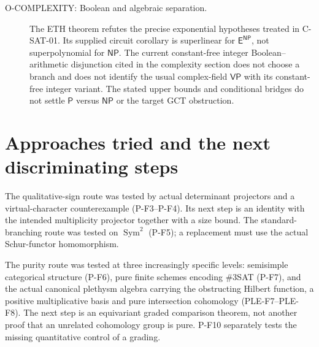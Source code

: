 \documentclass[11pt,a4paper]{article}
\begin{document}
\begin{description}
\item[O-COMPLEXITY: Boolean and algebraic separation.]
The ETH theorem refutes the precise exponential hypotheses treated in
C-SAT-01. Its supplied circuit corollary is superlinear for
$\mathsf E^{\mathsf{NP}}$, not superpolynomial for $\mathsf{NP}$.
The current constant-free integer Boolean--arithmetic disjunction cited
in the complexity section does not choose a branch and does not identify
the usual complex-field $\mathsf{VP}$ with its constant-free integer
variant. The stated upper bounds and conditional bridges do not settle
$\mathsf P$ versus $\mathsf{NP}$ or the target GCT obstruction.
\end{description}

\section{Approaches tried and the next discriminating steps}
The qualitative-sign route was tested by actual determinant projectors
and a virtual-character counterexample (P-F3--P-F4). Its next step is an
identity with the intended multiplicity projector together with a size
bound. The standard-branching route was tested on $\operatorname{Sym}^2$
(P-F5); a replacement must use the actual Schur-functor homomorphism.

The purity route was tested at three increasingly specific levels:
semisimple categorical structure (P-F6), pure finite schemes encoding
\#3SAT (P-F7), and the actual canonical plethysm algebra carrying the
obstructing Hilbert function, a positive multiplicative basis and pure
intersection cohomology (PLE-F7--PLE-F8). The next step is an
equivariant graded comparison theorem, not another proof that an unrelated
cohomology group is pure. P-F10 separately tests the missing quantitative
control of a grading.
\end{document}
